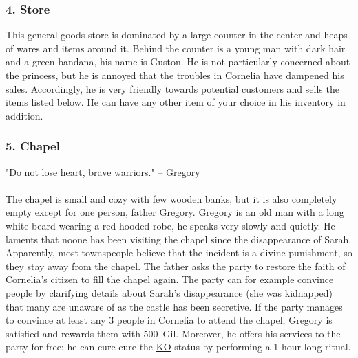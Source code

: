 \subsubsection*{4. Store}
This general goods store is dominated by a large counter in the center and heaps of wares and items around it.
Behind the counter is a young man with dark hair and a green bandana, his name is Guston.
He is not particularly concerned about the princess, but he is annoyed that the troubles in Cornelia have dampened his sales.
Accordingly, he is very friendly towards potential customers and sells the items listed below.
He can have any other item of your choice in his inventory in addition.
\vspace{0.3cm}
 
\subsubsection*{5. Chapel}
"Do not lose heart, brave warriors."
\indent -- Gregory\\\\
The chapel is small and cozy with few wooden banks, but it is also completely empty except for one person, father Gregory.
Gregory is an old man with a long white beard wearing a red hooded robe, he speaks very slowly and quietly.
He laments that noone has been visiting the chapel since the disappearance of Sarah.
Apparently, most townspeople believe that the incident is a divine punishment, so they stay away from the chapel.
The father asks the party to restore the faith of Cornelia's citizen to fill the chapel again.
The party can for example convince people by clarifying details about Sarah's disappearance (she was kidnapped) that many are unaware of as the castle has been secretive.
If the party manages to convince at least any 3 people in Cornelia to attend the chapel, Gregory is satisfied and rewards them with 500~Gil.
Moreover, he offers his services to the party for free: he can cure cure the \hyperlink{status}{KO} status by performing a 1 hour long ritual. 

